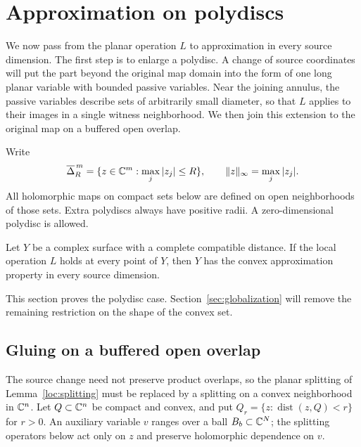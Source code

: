 \section{Approximation on polydiscs}
\label{sec:gluing}

We now pass from the planar operation $L$ to approximation in every
source dimension. The first step is to enlarge a polydisc. A change
of source coordinates will put the part beyond the original map domain
into the form of one long planar variable with bounded passive
variables. Near the joining annulus, the passive variables describe
sets of arbitrarily small diameter, so that $L$ applies to their
images in a single witness neighborhood. We then join this extension
to the original map on a buffered open overlap.

Write
\[
 \overline\Delta_R^{\,m}=\{z\in\mathbb C^m:\max_j|z_j|\leq R\},
 \qquad \|z\|_\infty=\max_j|z_j|.
\]
All holomorphic maps on compact sets below are defined on open
neighborhoods of those sets.  Extra polydiscs always have positive
radii.  A zero-dimensional polydisc is allowed.

\begin{theorem}\label{ana:cap}
Let \(Y\) be a complex surface with a complete compatible distance.
If the local operation \(L\) holds at every point of \(Y\), then \(Y\)
has the convex approximation property in every source dimension.
\end{theorem}

This section proves the polydisc case. Section~\ref{sec:globalization}
will remove the remaining restriction on the shape of the convex set.

\subsection{Gluing on a buffered open overlap}

The source change need not preserve product overlaps, so the planar
splitting of Lemma~\ref{loc:splitting} must be replaced by a splitting
on a convex neighborhood in $\mathbb C^n$. Let $Q\subset\mathbb C^n$ be compact
and convex, and put $Q_r=\{z:\operatorname{dist}(z,Q)<r\}$ for $r>0$.
An auxiliary variable $v$ ranges over a ball $B_b\subset\mathbb C^N$;
the splitting operators below act only on $z$ and preserve
holomorphic dependence on $v$.

